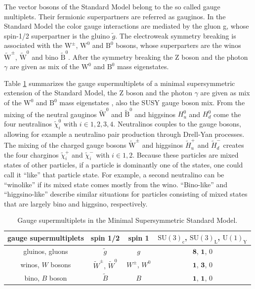 The vector bosons of the Standard Model belong to the so called gauge multiplets. Their fermionic superpartners are referred as gauginos. In the Standard Model the color gauge interactions are mediated by the gluon g, whose spin-1/2 superpartner is the gluino $\widetilde{g}$. The electroweak symmetry breaking is associated with the $\text{W}^{\pm}$, $\text{W}^{0}$ and $\text{B}^{0}$ bosons, whose superparters are the winos $\widetilde{\text{W}}^{\pm}$, $\widetilde{\text{W}}^{0}$ and bino $\widetilde{\text{B}}^{0}$. After the symmetry breaking the Z boson and the photon $\gamma$ are given as mix of the $\text{W}^{0}$ and $\text{B}^{0}$ mass eigenstates. 

 Table \ref{fig:gauge_supermultiplets} summarizes the gauge supermultiplets of a minimal supersymmetric extension of the Standard Model, the Z boson and the photon $\gamma$ are given as mix of the $\text{W}^{0}$ and $\text{B}^{0}$ mass eigenstates \cite{PhysRevD.13.974}, also the SUSY gauge boson mix. From the mixing of the neutral gauginos $\widetilde{\text{W}}^{0}$ and $\widetilde{\text{B}}^{0}$ and higgsinos $H^{0}_{u}$ and $H^{0}_{d}$ come the four neutralinos $\widetilde{\chi}^{0}_{i}$ with $i \in 1,2,3,4$. Neutralinos couples to the gauge bosons, allowing for example a neutralino pair production through Drell-Yan processes. The mixing of the charged gauge bosons $\widetilde{\text{W}}^{\pm}$ and higgsinos $\widetilde{H}^{+}_{u}$ and $\widetilde{H}^{-}_{d}$ creates the four charginos $\widetilde{\chi}^{+}_{i}$ and $\widetilde{\chi}^{-}_{i}$ with $i \in 1,2$. Because these particles are mixed states of other particles, if a particle is dominantly one of the states, one could call it “like” that particle state. For example, a second neutralino can be “winolike” if its mixed state comes mostly from the wino. “Bino-like” and “higgsino-like” describe similar situations for particles consisting of mixed states that are largely bino and higgsino, respectively.

\begin{table}[tbh!]
\centering
\begin{tabular}{|c || c | c | c |}
	\hline
	gauge supermultiplets & spin 1/2 & spin 1 & $\mathrm{SU}(3)_{\mathrm{c}}$, $\mathrm{SU}(3)_{\mathrm{L}}$, $\mathrm{U}(1)_{\mathrm{Y}}$\\\hline\hline
	gluinos, gluons & $\widetilde{g}$ & $g$ & $\mathbf{8}$, $\mathbf{1}$, 0\\\hline
	winos, $W$ bosons & $\widetilde{W}^\pm$, $\widetilde{W}^0$ & $W^\pm$, $W^0$ &   $\mathbf{1}$, $\mathbf{3}$, 0\\\hline
	bino, $B$ boson & $\widetilde{B}$ & $B$ &   $\mathbf{1}$, $\mathbf{1}$, 0\\\hline
\end{tabular}
	\caption{Gauge supermultiplets in the Minimal Supersymmetric Standard Model.}
	\label{fig:gauge_supermultiplets}
\end{table}

